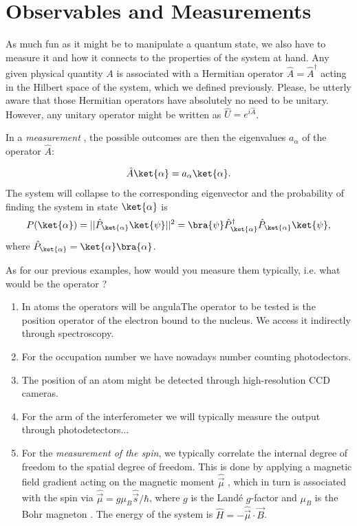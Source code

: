 \section{Observables and Measurements}
As much fun as it might be to manipulate a quantum state, we also have to measure it and how it connects to the properties of the system at hand. Any given physical quantity $A$ is associated with a Hermitian operator $\hat{A} = \hat{A}^\dag$ acting in the Hilbert space of the system, which we defined previously. Please, be utterly aware that those Hermitian operators have absolutely no need to be unitary. However, any unitary operator might be written as $\hat{U}= e^{i\hat{A}}$.

In a \emph{measurement} , the possible outcomes are then the eigenvalues $a_\alpha$  of the operator $\hat{A}$:

\begin{align}
	\hat{A}\ket{\alpha}=a_{\alpha}\ket{\alpha}.
\end{align}
The system will collapse to the corresponding eigenvector and the probability of finding the system in state $\ket{\alpha}$ is
\begin{align}
	P(\ket{\alpha})=||\hat{P}_{\ket{\alpha}} \ket{\psi}||^2 = \bra{\psi} \hat{P}^{\dag}_{\ket{\alpha}} \hat{P}_{\ket{\alpha}} \ket{\psi},
\end{align}
where $\hat{P}_{\ket{\alpha}}= \ket{\alpha} \bra{\alpha}$.

As for our previous examples, how would you measure them typically, i.e. what would be the operator ?
\begin{enumerate}
\item In atoms the operators will be angulaThe operator to be tested is the position operator of the electron bound to the nucleus. We access it indirectly through spectroscopy.
\item For the occupation number we have nowadays number counting photodectors.
\item The position of an atom might be detected through high-resolution CCD cameras.
\item For the arm of the interferometer we will typically measure the output through photodetectors...
\item For the \textit{measurement of the spin}, we typically correlate the internal degree of freedom to the spatial degree of freedom. This is done by applying a magnetic field gradient acting on the magnetic moment $\hat{\vec{\mu}}$ , which in turn is associated with the spin via $\hat{\vec{\mu}} = g \mu_B \hat{\vec{s}}/\hbar$, where $g$ is the Landé $g$-factor  and $\mu_B$ is the Bohr magneton . The energy of the system is $\hat{H} = -\hat{\vec{\mu}} \cdot \vec{B}$.
\end{enumerate}
